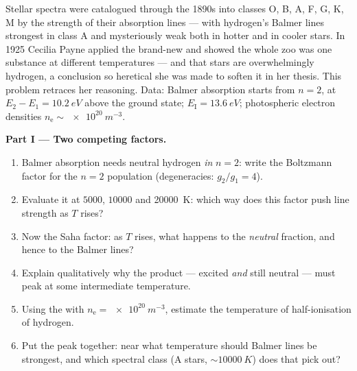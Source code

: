 \begin{problem}\label{pb:b3:grand-canonical:1}
Stellar spectra were catalogued through the 1890s into classes
O, B, A, F, G, K, M by the strength of their absorption lines ---
with hydrogen's Balmer lines strongest in class A and mysteriously
weak both in hotter and in cooler stars. In 1925 Cecilia Payne
applied the brand-new  and showed the whole zoo was
one substance at different temperatures --- and that stars are
overwhelmingly hydrogen, a conclusion so heretical she was made to
soften it in her thesis. This problem retraces her reasoning.
Data: Balmer absorption starts from $n = 2$, at $E_2 - E_1 =
\qty{10.2}{eV}$ above the ground state; $E_{\text{I}} =
\qty{13.6}{eV}$; photospheric electron densities $n_{\text{e}}
\sim \qty{e20}{m^{-3}}$.

\medskip\noindent\textbf{Part I --- Two competing factors.}
\begin{enumerate}
  \item Balmer absorption needs neutral hydrogen \emph{in} $n =
        2$: write the Boltzmann factor for the $n = 2$ population
        (degeneracies: $g_2/g_1 = 4$).
  \item Evaluate it at $5000$, $10000$ and \qty{20000}{K}: which
        way does this factor push line strength as $T$ rises?
  \item Now the Saha factor: as $T$ rises, what happens to the
        \emph{neutral} fraction, and hence to the Balmer lines?
  \item Explain qualitatively why the product --- excited
        \emph{and} still neutral --- must peak at some
        intermediate temperature.
  \item Using the  with $n_{\text{e}} =
        \qty{e20}{m^{-3}}$, estimate the temperature of
        half-ionisation of hydrogen.
  \item Put the peak together: near what temperature should
        Balmer lines be strongest, and which spectral class
        (A stars, $\sim\qty{10000}{K}$) does that pick out?
\end{enumerate}


\end{problem}
